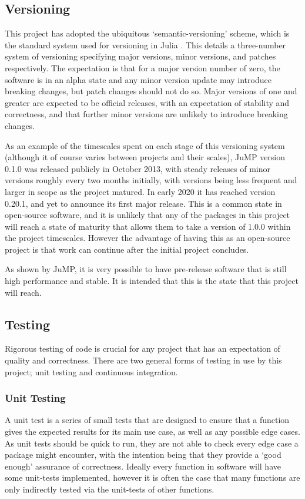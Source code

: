 \subsection{Versioning}
This project has adopted the ubiquitous `semantic-versioning' scheme, which is the standard system used for versioning in Julia \cite{JuliasProcess}. This details a three-number system of versioning specifying major versions, minor versions, and patches respectively. The expectation is that for a major version number of zero, the software is in an alpha state and any minor version update may introduce breaking changes, but patch changes should not do so. Major versions of one and greater are expected to be official releases, with an expectation of stability and correctness, and that further minor versions are unlikely to introduce breaking changes.

As an example of the timescales spent on each stage of this versioning system (although it of course varies between projects and their scales), JuMP version 0.1.0 was released publicly in October 2013, with steady releases of minor versions roughly every two months initially, with versions being less frequent and larger in scope as the project matured. In early 2020 it has reached version 0.20.1, and yet to announce its first major release. This is a common state in open-source software, and it is unlikely that any of the packages in this project will reach a state of maturity that allows them to take a version of 1.0.0 within the project timescales. However the advantage of having this as an open-source project is that work can continue after the initial project concludes.

As shown by JuMP, it is very possible to have pre-release software that is still high performance and stable. It is intended that this is the state that this project will reach.

\subsection{Testing}
Rigorous testing of code is crucial for any project that has an expectation of quality and correctness. There are two general forms of testing in use by this project; unit testing and continuous integration.

\subsubsection{Unit Testing}
A unit test is a series of small tests that are designed to ensure that a function gives the expected results for its main use case, as well as any possible edge cases. As unit tests should be quick to run, they are not able to check every edge case a package might encounter, with the intention being that they provide a `good enough' assurance of correctness. Ideally every function in software will have some unit-tests implemented, however it is often the case that many functions are only indirectly tested via the unit-tests of other functions.

